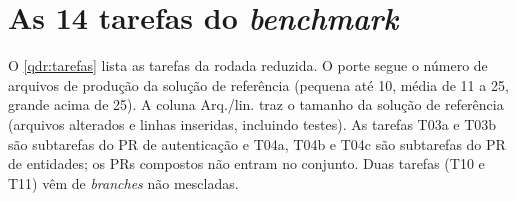 
\section{As 14 tarefas do \textit{benchmark}}
\label{apd:tarefas}

O \autoref{qdr:tarefas} lista as tarefas da rodada reduzida. O porte segue o
número de arquivos de produção da solução de referência (pequena até 10, média
de 11 a 25, grande acima de 25). A coluna Arq./lin. traz o tamanho da solução de
referência (arquivos alterados e linhas inseridas, incluindo testes). As tarefas T03a e
T03b são subtarefas do PR de autenticação e T04a, T04b e T04c são subtarefas do
PR de entidades; os PRs compostos não entram no conjunto. Duas tarefas (T10 e
T11) vêm de \textit{branches} não mescladas.

